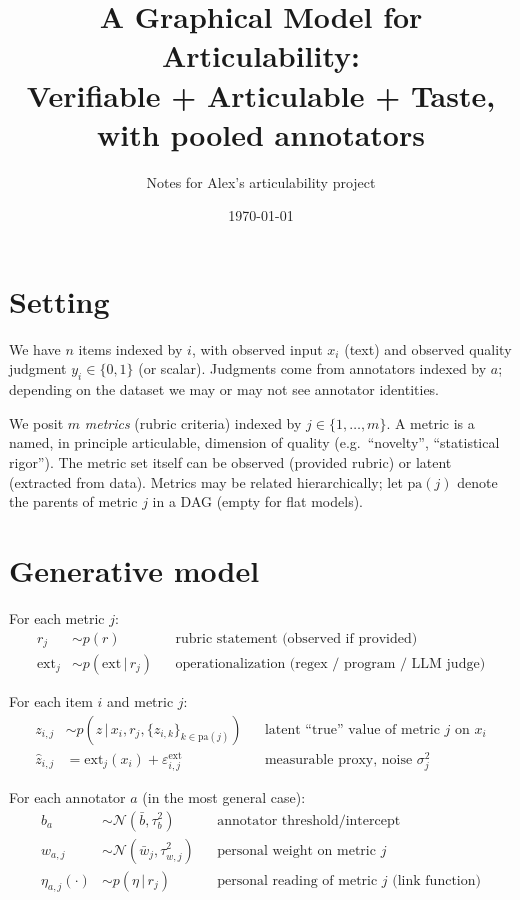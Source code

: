 \documentclass[11pt]{article}
\title{A Graphical Model for Articulability:\\
\large Verifiable + Articulable + Taste, with pooled annotators}
\author{Notes for Alex's articulability project}
\date{\today}
\newcommand{\given}{\,|\,}
\begin{document}
\maketitle

\section{Setting}

We have $n$ items indexed by $i$, with observed input $x_i$ (text) and observed quality
judgment $y_i \in \{0,1\}$ (or scalar). Judgments come from annotators indexed by $a$;
depending on the dataset we may or may not see annotator identities.

We posit $m$ \emph{metrics} (rubric criteria) indexed by $j \in \{1,\dots,m\}$. A metric is a
named, in principle articulable, dimension of quality (e.g.\ ``novelty'', ``statistical
rigor''). The metric set itself can be observed (provided rubric) or latent (extracted from
data). Metrics may be related hierarchically; let $\mathrm{pa}(j)$ denote the parents of
metric $j$ in a DAG (empty for flat models).

\section{Generative model}

For each metric $j$:
\begin{align}
r_j &\sim p(r) && \text{rubric statement (observed if provided)} \\
\text{ext}_j &\sim p(\text{ext} \given r_j) && \text{operationalization (regex / program / LLM judge)}
\end{align}

For each item $i$ and metric $j$:
\begin{align}
z_{i,j} &\sim p(z \given x_i, r_j, \{z_{i,k}\}_{k\in\mathrm{pa}(j)}) && \text{latent ``true'' value of metric $j$ on $x_i$} \\
\hat z_{i,j} &= \text{ext}_j(x_i) + \varepsilon^{\text{ext}}_{i,j} && \text{measurable proxy, noise } \sigma_j^2
\end{align}

For each annotator $a$ (in the most general case):
\begin{align}
b_a &\sim \mathcal{N}(\bar b, \tau_b^2) && \text{annotator threshold/intercept} \\
w_{a,j} &\sim \mathcal{N}(\bar w_j, \tau_{w,j}^2) && \text{personal weight on metric $j$} \\
\eta_{a,j}(\cdot) &\sim p(\eta \given r_j) && \text{personal reading of metric $j$ (link function)}
\end{align}
\end{document}
